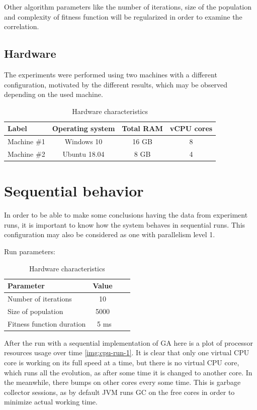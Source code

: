 Other algorithm parameters like the number of iterations, size of the population and complexity of fitness function will be regularized in order to examine the correlation.

\subsection{Hardware}

The experiments were performed using two machines with a different configuration, motivated by the different results, which may be observed depending on the used machine.

\begin{table}[h]
\centering\caption{Hardware characteristics \label{tab:exp-hardware}}
\begin{tabular}{|l|c|c|c|}
\hline
\textbf{Label} & \textbf{Operating system} & \textbf{Total RAM} & \textbf{vCPU cores} \\
\hline
Machine \#1 & Windows 10 & 16 GB & 8 \\
\hline
Machine \#2 & Ubuntu 18.04 & 8 GB & 4 \\
\hline
\end{tabular}
\end{table}

\section{Sequential behavior}

In order to be able to make some conclusions having the data from experiment runs, it is important to know how the system behaves in sequential runs. This configuration may also be considered as one with parallelism level 1.

Run parameters:
\begin{table}[h]
\centering\caption{Hardware characteristics \label{tab:exp-hardware}}
\begin{tabular}{|l|c|c|c|}
\hline
\textbf{Parameter} & \textbf{Value}  \\
\hline
Number of iterations & 10 \\
\hline
Size of population & 5000 \\
\hline
Fitness function duration & ~5 ms \\
\hline
\end{tabular}
\end{table}

After the run with a sequential implementation of GA here is a plot of processor resources usage over time \ref{img:cpu-run-1}. It is clear that only one virtual CPU core is working on its full speed at a time, but there is no virtual CPU core, which runs all the evolution, as after some time it is changed to another core. In the meanwhile, there bumps on other cores every some time. This is garbage collector sessions, as by default JVM runs GC on the free cores in order to minimize actual working time.

